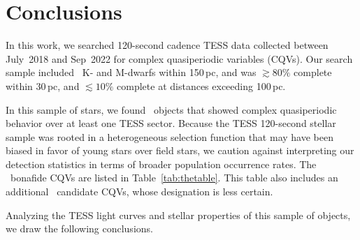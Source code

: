 \documentclass[11pt,twocolumn,tighten]{aastex63}
\begin{document}
\section{Conclusions}
\label{sec:conclusion}

In this work, we searched 120-second cadence TESS data collected
between July~2018 and Sep~2022 for complex quasiperiodic variables
(CQVs).  Our search sample included \nstarssearched\ K- and M-dwarfs
within 150\,pc, and was $\gtrsim 80\%$ complete within 30\,pc, and
$\lesssim 10\%$ complete at distances exceeding 100\,pc.

In this sample of stars, we found \ngoods\ objects that showed complex
quasiperiodic behavior over at least one TESS sector.  Because the
TESS 120-second stellar sample was rooted in a heterogeneous selection
function that may have been biased in favor of young stars over field
stars, we caution against interpreting our detection statistics in
terms of broader population occurrence rates.  The \ngoods\ bonafide
CQVs are listed in Table~\ref{tab:thetable}.  This table also includes
an additional \nmaybes\ candidate CQVs, whose designation is less
certain.

Analyzing the TESS light curves and stellar properties of this sample
of objects, we draw the following conclusions.
\end{document}
